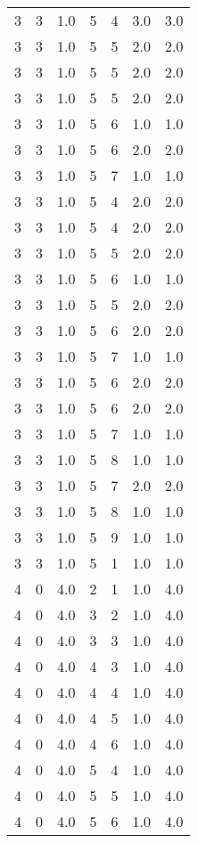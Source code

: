 \documentclass[a4paper,12pt]{article}
\begin{document}
\begin{center}
\begin{longtable}{ c c c | c c c | c }
        3 & 3 & 1.0 & 5 & 4 & 3.0 & 3.0 \\
        3 & 3 & 1.0 & 5 & 5 & 2.0 & 2.0 \\
        3 & 3 & 1.0 & 5 & 5 & 2.0 & 2.0 \\
        3 & 3 & 1.0 & 5 & 5 & 2.0 & 2.0 \\
        3 & 3 & 1.0 & 5 & 6 & 1.0 & 1.0 \\
        3 & 3 & 1.0 & 5 & 6 & 2.0 & 2.0 \\
        3 & 3 & 1.0 & 5 & 7 & 1.0 & 1.0 \\
        3 & 3 & 1.0 & 5 & 4 & 2.0 & 2.0 \\
        3 & 3 & 1.0 & 5 & 4 & 2.0 & 2.0 \\
        3 & 3 & 1.0 & 5 & 5 & 2.0 & 2.0 \\
        3 & 3 & 1.0 & 5 & 6 & 1.0 & 1.0 \\
        3 & 3 & 1.0 & 5 & 5 & 2.0 & 2.0 \\
        3 & 3 & 1.0 & 5 & 6 & 2.0 & 2.0 \\
        3 & 3 & 1.0 & 5 & 7 & 1.0 & 1.0 \\
        3 & 3 & 1.0 & 5 & 6 & 2.0 & 2.0 \\
        3 & 3 & 1.0 & 5 & 6 & 2.0 & 2.0 \\
        3 & 3 & 1.0 & 5 & 7 & 1.0 & 1.0 \\
        3 & 3 & 1.0 & 5 & 8 & 1.0 & 1.0 \\
        3 & 3 & 1.0 & 5 & 7 & 2.0 & 2.0 \\
        3 & 3 & 1.0 & 5 & 8 & 1.0 & 1.0 \\
        3 & 3 & 1.0 & 5 & 9 & 1.0 & 1.0 \\
        3 & 3 & 1.0 & 5 & 1 & 1.0 & 1.0 \\
        4 & 0 & 4.0 & 2 & 1 & 1.0 & 4.0 \\
        4 & 0 & 4.0 & 3 & 2 & 1.0 & 4.0 \\
        4 & 0 & 4.0 & 3 & 3 & 1.0 & 4.0 \\
        4 & 0 & 4.0 & 4 & 3 & 1.0 & 4.0 \\
        4 & 0 & 4.0 & 4 & 4 & 1.0 & 4.0 \\
        4 & 0 & 4.0 & 4 & 5 & 1.0 & 4.0 \\
        4 & 0 & 4.0 & 4 & 6 & 1.0 & 4.0 \\
        4 & 0 & 4.0 & 5 & 4 & 1.0 & 4.0 \\
        4 & 0 & 4.0 & 5 & 5 & 1.0 & 4.0 \\
        4 & 0 & 4.0 & 5 & 6 & 1.0 & 4.0 \\

\end{longtable}
\end{center}
\end{document}
